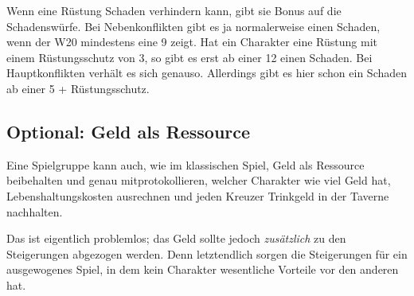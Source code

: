 Wenn eine Rüstung Schaden verhindern kann, gibt sie Bonus auf die Schadenswürfe. Bei Nebenkonflikten gibt es ja normalerweise einen Schaden, wenn der W20 mindestens eine 9 zeigt. Hat ein Charakter eine Rüstung mit einem Rüstungsschutz von 3, so gibt es erst ab einer 12 einen Schaden. Bei Hauptkonflikten verhält es sich genauso. Allerdings gibt es hier schon ein Schaden ab einer 5 + Rüstungsschutz.


\begin{optional}
\section{Optional: Geld als Ressource}

Eine Spielgruppe kann auch, wie im klassischen Spiel, Geld als Ressource beibehalten und genau mitprotokollieren, welcher Charakter wie viel Geld hat, Lebenshaltungskosten ausrechnen und jeden Kreuzer Trinkgeld in der Taverne nachhalten.

Das ist eigentlich problemlos; das Geld sollte jedoch \emph{zusätzlich} zu den Steigerungen abgezogen werden. Denn letztendlich sorgen die Steigerungen für ein ausgewogenes Spiel, in dem kein Charakter wesentliche Vorteile vor den anderen hat.
\end{optional}


